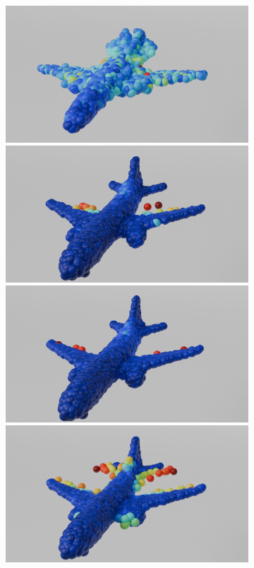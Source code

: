 \begin{figure}[htb]
\begin{subfigure}[t]{0.315\textwidth}
        \includegraphics[width=\textwidth]{figures/dc_lin_ap2.png}
        \includegraphics[width=\textwidth]{figures/do_lin_ap2.png}
        \includegraphics[width=\textwidth]{figures/ens_lin_ap2.png}
        \includegraphics[width=\textwidth]{figures/iml_lin_ap2.png}

\end{subfigure}
\end{figure}
